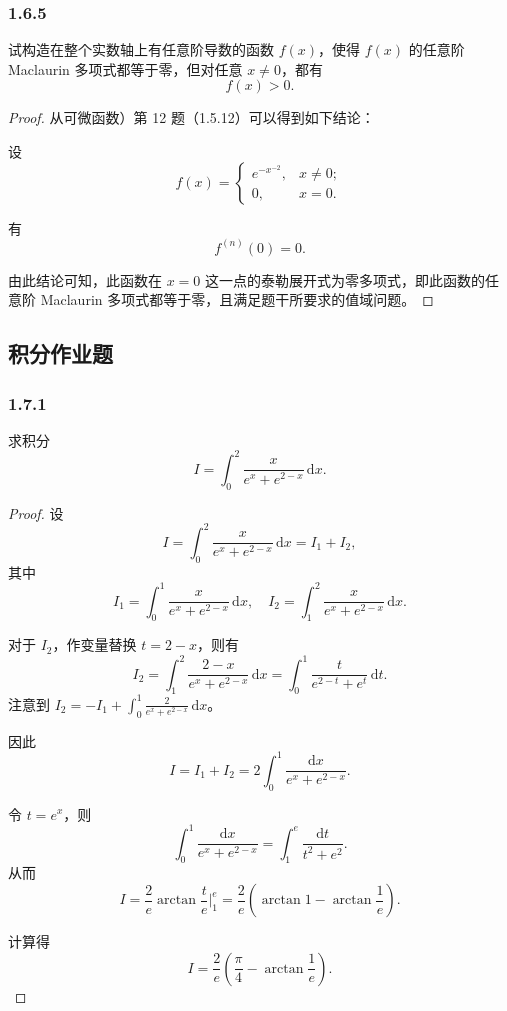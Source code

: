 \documentclass[12pt]{ctexart}
\begin{document}
\subsubsection*{1.6.5}

试构造在整个实数轴上有任意阶导数的函数 $f(x)$，使得 $f(x)$ 的任意阶 Maclaurin 多项式都等于零，但对任意 $x \neq 0$，都有
\[
f(x) > 0.
\]
\begin{proof}
从可微函数）第 12 题（1.5.12）可以得到如下结论：

设
\[
f(x) =
\begin{cases}
e^{-x^{-2}}, & x \neq 0; \\
0, & x = 0.
\end{cases}
\]

有
\[
f^{(n)}(0) = 0.
\]

由此结论可知，此函数在 $x = 0$ 这一点的泰勒展开式为零多项式，即此函数的任意阶 Maclaurin 多项式都等于零，且满足题干所要求的值域问题。
\end{proof}

\subsection{积分作业题}
\subsubsection*{1.7.1}

求积分
\[
I = \int_{0}^{2} \frac{x}{e^x + e^{2-x}} \, \mathrm{d}x.
\]

\begin{proof}
设
\[
I = \int_{0}^{2} \frac{x}{e^x + e^{2-x}} \, \mathrm{d}x = I_1 + I_2,
\]
其中
\[
I_1 = \int_{0}^{1} \frac{x}{e^x + e^{2-x}} \, \mathrm{d}x, \quad I_2 = \int_{1}^{2} \frac{x}{e^x + e^{2-x}} \, \mathrm{d}x.
\]

对于 $I_2$，作变量替换 $t = 2 - x$，则有
\[
I_2 = \int_{1}^{2} \frac{2 - x}{e^x + e^{2-x}} \, \mathrm{d}x = \int_{0}^{1} \frac{t}{e^{2-t} + e^t} \, \mathrm{d}t.
\]
注意到 $I_2 = -I_1 + \int_{0}^{1} \frac{2}{e^x + e^{2-x}} \, \mathrm{d}x$。

因此
\[
I = I_1 + I_2 = 2 \int_{0}^{1} \frac{\mathrm{d}x}{e^x + e^{2-x}}.
\]

令 $t = e^x$，则
\[
\int_{0}^{1} \frac{\mathrm{d}x}{e^x + e^{2-x}} = \int_{1}^{e} \frac{\mathrm{d}t}{t^2 + e^2}.
\]
从而
\[
I = \frac{2}{e} \arctan \frac{t}{e} \bigg|_{1}^{e} = \frac{2}{e} \left( \arctan 1 - \arctan \frac{1}{e} \right).
\]

计算得
\[
I = \frac{2}{e} \left( \frac{\pi}{4} - \arctan \frac{1}{e} \right).
\]
\end{proof}
\end{document}
